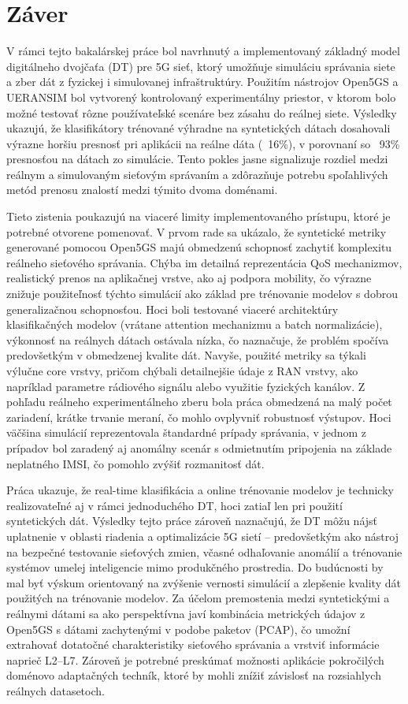 \chapter{Záver}

V rámci tejto bakalárskej práce bol navrhnutý a implementovaný základný model digitálneho dvojčaťa (DT) pre 5G sieť, ktorý umožňuje simuláciu správania siete a zber dát z fyzickej i simulovanej infraštruktúry. Použitím nástrojov Open5GS a UERANSIM bol vytvorený kontrolovaný experimentálny priestor, v ktorom bolo možné testovať rôzne používateľské scenáre bez zásahu do reálnej siete. Výsledky ukazujú, že klasifikátory trénované výhradne na syntetických dátach dosahovali výrazne horšiu presnosť pri aplikácii na reálne dáta (~16\%), v porovnaní so ~93\% presnosťou na dátach zo simulácie. Tento pokles jasne signalizuje rozdiel medzi reálnym a simulovaným sieťovým správaním a zdôrazňuje potrebu spoľahlivých metód prenosu znalostí medzi týmito dvoma doménami.

Tieto zistenia poukazujú na viaceré limity implementovaného prístupu, ktoré je potrebné otvorene pomenovať. V prvom rade sa ukázalo, že syntetické metriky generované pomocou Open5GS majú obmedzenú schopnosť zachytiť komplexitu reálneho sieťového správania. Chýba im detailná reprezentácia QoS mechanizmov, realistický prenos na aplikačnej vrstve, ako aj podpora mobility, čo výrazne znižuje použiteľnosť týchto simulácií ako základ pre trénovanie modelov s dobrou generalizačnou schopnosťou. Hoci boli testované viaceré architektúry klasifikačných modelov (vrátane attention mechanizmu a batch normalizácie), výkonnosť na reálnych dátach ostávala nízka, čo naznačuje, že problém spočíva predovšetkým v obmedzenej kvalite dát. Navyše, použité metriky sa týkali výlučne core vrstvy, pričom chýbali detailnejšie údaje z RAN vrstvy, ako napríklad parametre rádiového signálu alebo využitie fyzických kanálov. Z pohľadu reálneho experimentálneho zberu bola práca obmedzená na malý počet zariadení, krátke trvanie meraní, čo mohlo ovplyvniť robustnosť výstupov. Hoci väčšina simulácií reprezentovala štandardné prípady správania, v jednom z prípadov bol zaradený aj anomálny scenár s odmietnutím pripojenia na základe neplatného IMSI, čo pomohlo zvýšiť rozmanitosť dát.

Práca ukazuje, že real-time klasifikácia a online trénovanie modelov je technicky realizovateľné aj v rámci jednoduchého DT, hoci zatiaľ len pri použití syntetických dát. Výsledky tejto práce zároveň naznačujú, že DT môžu nájsť uplatnenie v oblasti riadenia a optimalizácie 5G sietí – predovšetkým ako nástroj na bezpečné testovanie sieťových zmien, včasné odhaľovanie anomálií a trénovanie systémov umelej inteligencie mimo produkčného prostredia. Do budúcnosti by mal byť výskum orientovaný na zvýšenie vernosti simulácií a zlepšenie kvality dát použitých na trénovanie modelov. Za účelom premostenia medzi syntetickými a reálnymi dátami sa ako perspektívna javí kombinácia metrických údajov z Open5GS s dátami zachytenými v podobe paketov (PCAP), čo umožní extrahovať dotatočné charakteristiky sieťového správania a vrstviť informácie naprieč L2–L7. Zároveň je potrebné preskúmať možnosti aplikácie pokročilých doménovo adaptačných techník, ktoré by mohli znížiť závislosť na rozsiahlych reálnych datasetoch.

